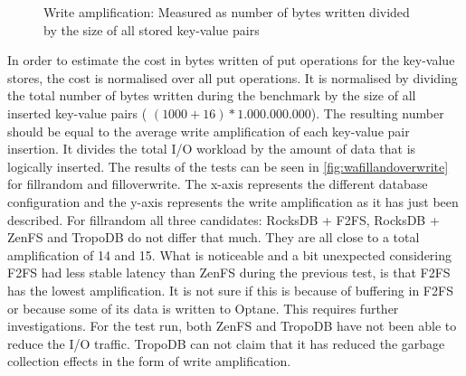 \begin{figure}[!ht]
    \hspace*{-0.075\textwidth} %
    \raggedleft
    \caption{ Write amplification: Measured as number of bytes written divided by the size of all stored key-value pairs }
    \label{fig:wafillandoverwrite}
\end{figure}

In order to estimate the cost in bytes written of put operations for the key-value stores, the cost is normalised over all put operations. It is normalised by dividing the total number of bytes written during the benchmark by the size of all inserted key-value pairs ( $(1000+16) * 1.000.000.000$). The resulting number should be equal to the average write amplification of each key-value pair insertion. It divides the total I/O workload by the amount of data that is logically inserted. The results of the tests can be seen in \autoref{fig:wafillandoverwrite} for fillrandom and filloverwrite. The x-axis represents the different database configuration and the y-axis represents the write amplification as it has just been described. For fillrandom all three candidates: RocksDB + F2FS, RocksDB + ZenFS and TropoDB do not differ that much. They are all close to a total amplification of 14 and 15. What is noticeable and a bit unexpected considering F2FS had less stable latency than ZenFS during the previous test, is that F2FS has the lowest amplification. It is not sure if this is because of buffering in F2FS or because some of its data is written to Optane. This requires further investigations.  For the test run, both ZenFS and TropoDB have not been able to reduce the I/O traffic. TropoDB can not claim that it has reduced the garbage collection effects in the form of write amplification. 

